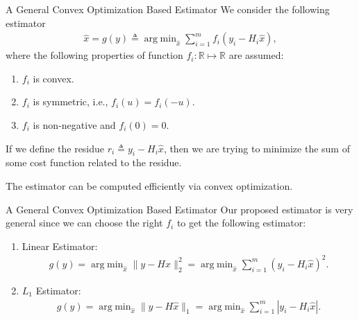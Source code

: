 \documentclass[10pt]{beamer}
\DeclareMathOperator{\argmin}{arg\;min}
\begin{document}
\begin{frame}{A General Convex Optimization Based Estimator}
  We consider the following estimator
  \begin{align*}
    \hat x = g(y) \triangleq \argmin_{\hat x} \sum_{i=1}^m f_i(y_i-H_i \hat x),
  \end{align*}
  where the following properties of function $f_i:\mathbb R\mapsto \mathbb R$ are assumed:
  \begin{enumerate}
  \item $f_i$ is convex.
  \item $f_i$ is symmetric, i.e., $f_i(u) = f_i(-u)$.
  \item $f_i$ is non-negative and $f_i(0) = 0$.
  \end{enumerate} 

  If we define the residue $r_i\triangleq y_i - H_i\hat x$, then we are trying to minimize the sum of some cost function related to the residue.

  The estimator can be computed efficiently via convex optimization. 
\end{frame}

\begin{frame}{A General Convex Optimization Based Estimator}
  Our proposed estimator is very general since we can choose the right $f_i$ to get the following estimator:
  \begin{enumerate}
  \item Linear Estimator:
    \begin{align*}
      g(y) = \argmin_{\hat x} \|y-H\hat x\|_2^2= \argmin_{\hat x}  \sum_{i=1}^m (y_i-H_i\hat x)^2.
    \end{align*}
  \item $L_1$ Estimator:
    \begin{align*}
      g(y) = \argmin_{\hat x} \|y-H\hat x\|_1=\argmin_{\hat x} \sum_{i=1}^m |y_i-H_i\hat x|.
    \end{align*}
  \end{enumerate}
\end{frame}
\end{document}

